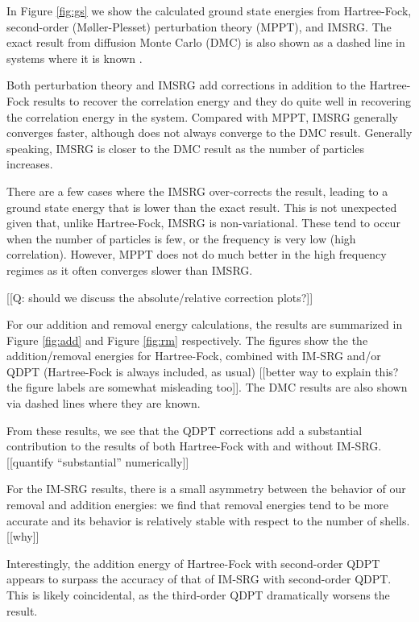 \documentclass[amsmath, amssymb, aps, floatfix, nofootinbib, preprintnumbers,showpacs, superscriptaddress, twocolumn]{revtex4-1}
\begin{document}
In Figure \ref{fig:gs} we show the calculated ground state energies from
Hartree-Fock, second-order (M\o ller-Plesset) perturbation theory (MPPT), and
IMSRG.  The exact result from diffusion Monte Carlo (DMC) is also shown as a
dashed line in systems where it is known \cite{PhysRevB.84.115302}.

Both perturbation theory and IMSRG add corrections in addition to the
Hartree-Fock results to recover the correlation energy and they do quite well
in recovering the correlation energy in the system.  Compared with MPPT, IMSRG
generally converges faster, although does not always converge to the DMC
result.  Generally speaking, IMSRG is closer to the DMC result as the number
of particles increases.

There are a few cases where the IMSRG over-corrects the result, leading to a
ground state energy that is lower than the exact result.  This is not
unexpected given that, unlike Hartree-Fock, IMSRG is non-variational.  These
tend to occur when the number of particles is few, or the frequency is very
low (high correlation).  However, MPPT does not do much better in the high
frequency regimes as it often converges slower than IMSRG.

[[Q: should we discuss the absolute/relative correction plots?]]

For our addition and removal energy calculations, the results are summarized
in Figure \ref{fig:add} and Figure \ref{fig:rm} respectively.  The figures
show the the addition/removal energies for Hartree-Fock, combined with IM-SRG
and/or QDPT (Hartree-Fock is always included, as usual) [[better way to
explain this? the figure labels are somewhat misleading too]].  The DMC
results are also shown via dashed lines where they are known.

From these results, we see that the QDPT corrections add a substantial
contribution to the results of both Hartree-Fock with and without IM-SRG.
[[quantify ``substantial'' numerically]]

For the IM-SRG results, there is a small asymmetry between the behavior of our
removal and addition energies: we find that removal energies tend to be more
accurate and its behavior is relatively stable with respect to the number of
shells. [[why]]

Interestingly, the addition energy of Hartree-Fock with second-order QDPT
appears to surpass the accuracy of that of IM-SRG with second-order QDPT.
This is likely coincidental, as the third-order QDPT dramatically worsens the
result.
\end{document}
